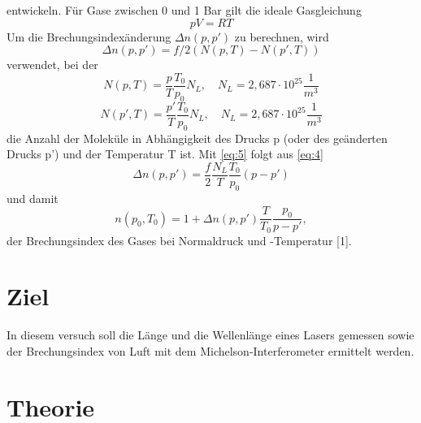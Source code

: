 entwickeln. Für Gase zwischen 0 und 1 Bar gilt die ideale Gasgleichung
\begin{equation}
  pV=RT 
  \label{eq:3}
\end{equation}
Um die Brechungsindexänderung $\Delta n(p,p')$ zu berechnen, wird 
\begin{equation}
  \Delta n(p,p')=f/2(N(p,T)-N(p',T))
  \label{eq:4}
\end{equation}
verwendet, bei der 
\begin{equation}
  N(p,T)=\frac{p}{T}\frac{T_{0}}{p_{0}}N_{L}, \quad N_{L}=2,687\cdot 10^25\frac{1}{m^3} \nonumber
\end{equation}
\begin{equation}
  N(p',T)=\frac{p'}{T}\frac{T_{0}}{p_{0}}N_{L}, \quad N_{L}=2,687\cdot 10^25\frac{1}{m^3}
  \label{eq:5}
\end{equation}
die Anzahl der Moleküle in Abhängigkeit des Drucks p (oder des geänderten Drucks p') und der Temperatur T ist.
Mit \eqref{eq:5} folgt aus \eqref{eq:4}
\begin{equation}
  \Delta n(p,p')=\frac{f}{2}\frac{N_{L}}{T}\frac{T_{0}}{p_{0}}(p-p') 
  \label{eq:5}
\end{equation}
und damit
\begin{equation}
  n(p_{0},T_{0})=1+\Delta n(p,p')\frac{T}{T_{0}}\frac{p_0}{p-p'},
  \label{eq:6}
\end{equation}
der Brechungsindex des Gases bei Normaldruck und -Temperatur [1].

\section{Ziel}

In diesem versuch soll die Länge und die Wellenlänge eines Lasers gemessen sowie der Brechungsindex von Luft mit dem Michelson-Interferometer ermittelt werden.

\section{Theorie}


